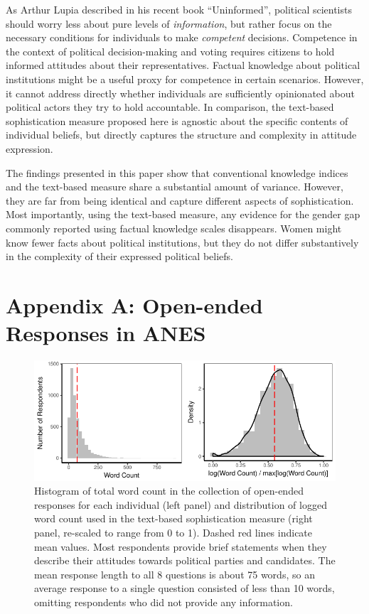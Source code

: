 \documentclass[12pt]{article}
\begin{document}
As Arthur Lupia \citeyearpar{lupia2015uninformed} described in his recent book ``Uninformed'', political scientists should worry less about pure levels of \textit{information}, but rather focus on the necessary conditions for individuals to make \textit{competent} decisions. Competence in the context of political decision-making and voting requires citizens to hold informed attitudes about their representatives. Factual knowledge about political institutions might be a useful proxy for competence in certain scenarios. However, it cannot address directly whether individuals are sufficiently opinionated about political actors they try to hold accountable. In comparison, the text-based sophistication measure proposed here is agnostic about the specific contents of individual beliefs, but directly captures the structure and complexity in attitude expression.

The findings presented in this paper show that conventional knowledge indices and the text-based measure share a substantial amount of variance. However, they are far from being identical and capture different aspects of sophistication. Most importantly, using the text-based measure, any evidence for the gender gap commonly reported using factual knowledge scales disappears. Women might know fewer facts about political institutions, but they do not differ substantively in the complexity of their expressed political beliefs.


\singlespacing



\clearpage
\section*{Appendix A: Open-ended Responses in ANES}
\renewcommand\thefigure{A.\arabic{figure}}
\renewcommand\thetable{A.\arabic{table}}
\setcounter{figure}{0}
\setcounter{table}{0}

\begin{figure}[h]\centering
\includegraphics{../fig/wc.pdf}
\caption{Histogram of total word count in the collection of open-ended responses for each individual (left panel) and distribution of logged word count used in the text-based sophistication measure (right panel, re-scaled to range from 0 to 1). Dashed red lines indicate mean values. Most respondents provide brief statements when they describe their attitudes towards political parties and candidates. The mean response length to all 8 questions is about 75 words, so an average response to a single question consisted of less than 10 words, omitting respondents who did not provide any information.}\label{fig:wc}
\end{figure}
\end{document}
